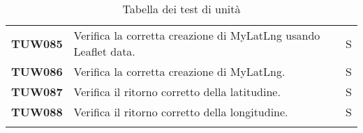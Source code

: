 \documentclass[../piano-di-qualifica.tex]{subfiles}
\begin{document}
\begin{longtable}[H]{>{\centering\bfseries}m{3cm} >{}m{10cm} >{\centering\arraybackslash}m{3cm}}

TUW085             & Verifica la corretta creazione di MyLatLng usando Leaflet data. & S \\ 

TUW086             & Verifica la corretta creazione di MyLatLng. & S \\ 
 
TUW087             & Verifica il ritorno corretto della latitudine. & S \\ 

TUW088             & Verifica il ritorno corretto della longitudine. & S \\ 





  \rowcolor{white}
  \caption{Tabella dei test di unità}%
  \label{tab:test_di_unità}
\end{longtable}
\end{document}
